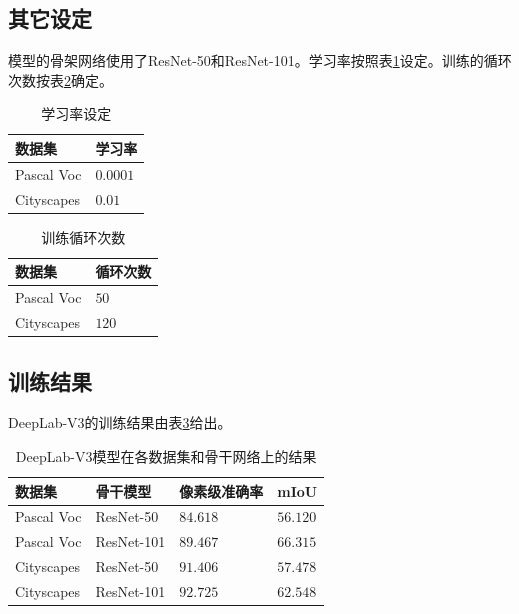 \documentclass[10pt, a4paper]{article}
\begin{document}
\subsection{其它设定}
模型的骨架网络使用了ResNet-50和ResNet-101。学习率按照表\ref{t1}设定。训练的循环次数按表\ref{t2}确定。

\begin{table}[h]
\begin{center}  
\begin{tabular}{ll}
    \toprule
    数据集 & 学习率\\
    \midrule
    Pascal Voc & $0.0001$ \\
    Cityscapes & $0.01$ \\
    \bottomrule
\end{tabular}
\end{center}
\caption{学习率设定}
\label{t1}
\end{table}

\begin{table}[h]
\begin{center}  
\begin{tabular}{ll}
    \toprule
    数据集 & 循环次数\\
    \midrule
    Pascal Voc & $50$ \\
    Cityscapes & $120$ \\
    \bottomrule
\end{tabular}
\end{center}
\caption{训练循环次数}
\label{t2}
\end{table}

\subsection{训练结果}
DeepLab-V3的训练结果由表\ref{t3}给出。

\begin{table}[h]
\begin{center}  
\begin{tabular}{llll}
        \toprule
        数据集 & 骨干模型 & 像素级准确率 & mIoU \\
        \midrule
        Pascal Voc & ResNet-50 & $84.618$ & $56.120$ \\
        Pascal Voc & ResNet-101 & $89.467$ & $66.315$ \\
        Cityscapes & ResNet-50 & $91.406$ & $57.478$ \\
        Cityscapes & ResNet-101 & $92.725$ & $62.548$ \\
        \bottomrule
\end{tabular}
\end{center}
\caption{DeepLab-V3模型在各数据集和骨干网络上的结果}
\label{t3}
\end{table}
\end{document}
